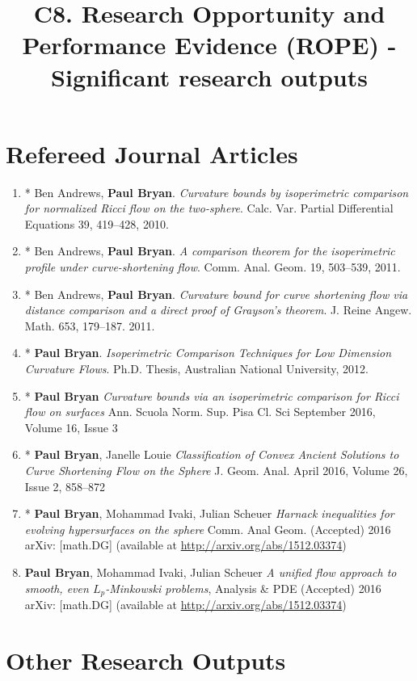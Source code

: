 \documentclass[12pt]{amsart}
\date{}
\author{}
\date{}
\title{C8. Research Opportunity and Performance Evidence (ROPE) - Significant research outputs}
\begin{document}
\maketitle

\section*{\textbf{Refereed Journal Articles}}
\label{sec-1}

\begin{enumerate}
\item * Ben Andrews, \textbf{Paul Bryan}. \emph{Curvature bounds by isoperimetric comparison for normalized Ricci flow on the two-sphere}. Calc. Var. Partial Differential Equations 39, 419--428, 2010.
\item * Ben Andrews, \textbf{Paul Bryan}. \emph{A comparison theorem for the isoperimetric profile under curve-shortening flow}. Comm. Anal. Geom. 19, 503--539, 2011.
\item * Ben Andrews, \textbf{Paul Bryan}. \emph{Curvature bound for curve shortening flow via distance comparison and a direct proof of Grayson's theorem}. J. Reine Angew. Math. 653, 179--187. 2011.
\item * \textbf{Paul Bryan}. \emph{Isoperimetric Comparison Techniques for Low Dimension Curvature Flows}. Ph.D. Thesis, Australian National University, 2012.
\item * \textbf{Paul Bryan} \emph{Curvature bounds via an isoperimetric comparison for Ricci flow on surfaces} Ann. Scuola Norm. Sup. Pisa Cl. Sci September 2016, Volume 16, Issue 3
\item * \textbf{Paul Bryan}, Janelle Louie \emph{Classification of Convex Ancient Solutions to Curve Shortening Flow on the Sphere} J. Geom. Anal. April 2016, Volume 26, Issue 2, 858--872
\item * \textbf{Paul Bryan}, Mohammad Ivaki, Julian Scheuer \emph{Harnack inequalities for evolving hypersurfaces on the sphere} Comm. Anal Geom. (Accepted) 2016 arXiv: [math.DG] (available at \url{http://arxiv.org/abs/1512.03374})
\item \textbf{Paul Bryan}, Mohammad Ivaki, Julian Scheuer \emph{A unified flow approach to smooth, even $L_p$-Minkowski problems}, Analysis \& PDE (Accepted) 2016 arXiv: [math.DG] (available at \url{http://arxiv.org/abs/1512.03374})
\end{enumerate}

\section*{\textbf{Other Research Outputs}}
\label{sec-2}
\end{document}
